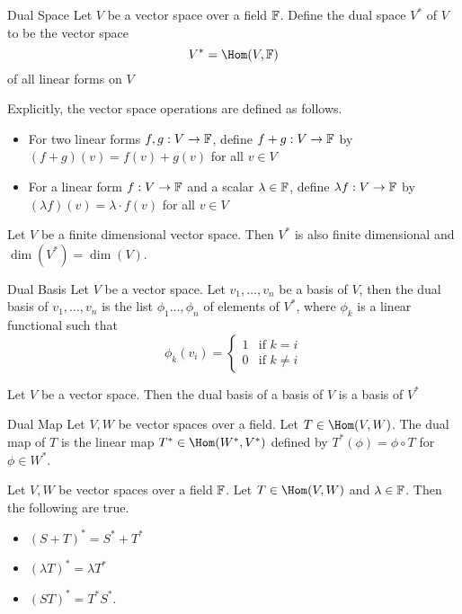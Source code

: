 \documentclass[a4paper]{article}
\begin{document}
\begin{defn}{Dual Space}{} Let $V$ be a vector space over a field $\mathbb{F}$. Define the dual space $V^\ast$ of $V$ to be the vector space $$V^\ast=\Hom(V,\F)$$ of all linear forms on $V$
\end{defn}

Explicitly, the vector space operations are defined as follows. 
\begin{itemize}
\item For two linear forms $f,g:V\to\mathbb{F}$, define $f+g:V\to\mathbb{F}$ by $(f+g)(v)=f(v)+g(v)$ for all $v\in V$
\item For a linear form $f:V\to\mathbb{F}$ and a scalar $\lambda\in\mathbb{F}$, define $\lambda f:V\to\mathbb{F}$ by $(\lambda f)(v)=\lambda\cdot f(v)$ for all $v\in V$
\end{itemize}

\begin{lmm}{}{} Let $V$ be a finite dimensional vector space. Then $V^\ast$ is also finite dimensional and $\dim(V^\ast)=\dim(V)$. 
\end{lmm}

\begin{defn}{Dual Basis}{} Let $V$ be a vector space. Let $v_1,\dots,v_n$ be a basis of $V$, then the dual basis of $v_1,\dots,v_n$ is the list $\phi_1\dots,\phi_n$ of elements of $V^\ast$, where $\phi_k$ is a linear functional such that $$\phi_k(v_i)=
\begin{cases}
1 & \text{if }k=i\\
0 & \text{if }k\neq i
\end{cases}$$
\end{defn}

\begin{prp}{}{} Let $V$ be a vector space. Then the dual basis of a basis of $V$ is a basis of $V^\ast$
\end{prp}

\begin{defn}{Dual Map}{} Let $V,W$ be vector spaces over a field. Let $T\in\Hom(V,W)$. The dual map of $T$ is the linear map $T^\ast\in\Hom(W^\ast,V^\ast)$ defined by $T^\ast(\phi)=\phi\circ T$ for $\phi\in W^\ast$. 
\end{defn}

\begin{prp}{}{} Let $V,W$ be vector spaces over a field $\mathbb{F}$. Let $T\in\Hom(V,W)$ and $\lambda\in\mathbb{F}$. Then the following are true. 
\begin{itemize}
\item $(S+T)^\ast=S^\ast+T^\ast$
\item $(\lambda T)^\ast=\lambda T^\ast$
\item $(ST)^\ast=T^\ast S^\ast$. 
\end{itemize}
\end{prp}
\end{document}
